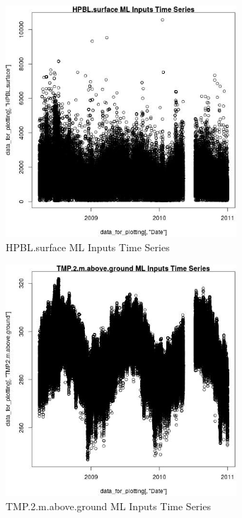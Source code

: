 \begin{figure} 
\centering  
\includegraphics[width=0.77\textwidth]{Code_Outputs/ML_input_report_ML_input_PM25_Step5_part_d_de_duplicated_aves_ML_input_HPBLsurfacevDate.jpg} 
\caption{\label{fig:ML_input_report_ML_input_PM25_Step5_part_d_de_duplicated_aves_ML_inputHPBLsurfacevDate}HPBL.surface ML Inputs Time Series} 
\end{figure} 
 

\begin{figure} 
\centering  
\includegraphics[width=0.77\textwidth]{Code_Outputs/ML_input_report_ML_input_PM25_Step5_part_d_de_duplicated_aves_ML_input_TMP2mabovegroundvDate.jpg} 
\caption{\label{fig:ML_input_report_ML_input_PM25_Step5_part_d_de_duplicated_aves_ML_inputTMP2mabovegroundvDate}TMP.2.m.above.ground ML Inputs Time Series} 
\end{figure} 
 

